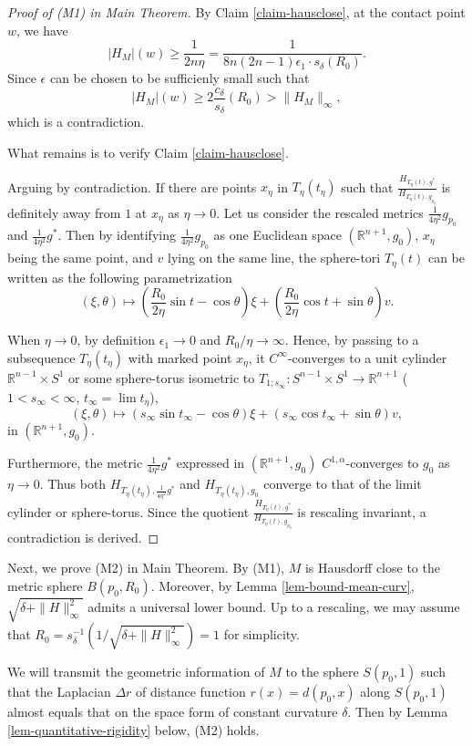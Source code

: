 \documentclass{amsart}
\numberwithin{equation}{section}
\theoremstyle{remark}
\renewcommand{\(}{\left(}
\renewcommand{\)}{\right)}
\renewcommand{\~}{\tilde}
\renewcommand{\-}{\overline}
\renewcommand{\d}{\delta}
\begin{document}
\begin{proof}[Proof of (M1) in Main Theorem]
	By Claim \ref{claim-hausclose}, at the contact point $w$, we have
	$$
	|H_M|(w)\ge \frac{1}{2n\eta}=\frac{1}{8n(2n-1)\epsilon_1\cdot s_\d(R_0)}.
	$$
	Since $\epsilon$ can be chosen to be sufficienly small such that 
	$$
	|H_M|(w)\ge 2\frac{c_\d}{s_\d}(R_0)>\|H_M\|_\infty,
	$$ 
	which is a contradiction.
	
	What remains is to verify Claim \ref{claim-hausclose}.
	
	Arguing by contradiction. If there are points $x_\eta$ in $T_\eta(t_\eta)$ such that  $\frac{H_{T_\eta(t),g^*}}{H_{T_\eta(t),g_{p_0}}}$ is definitely away from $1$ at $x_\eta$ as $\eta\to 0$. Let us consider the rescaled metrics $\frac{1}{4\eta^2}g_{p_0}$ and $\frac{1}{4\eta^2}g^*$. Then by identifying $\frac{1}{4\eta^2}g_{p_0}$ as one Euclidean space $(\mathbb R^{n+1},g_0)$, $x_\eta$ being the same point, and $v$ lying on the same line, the sphere-tori $T_\eta(t)$ can be written as the following parametrization
	$$ (\xi,\theta)\mapsto (\frac{R_0}{2\eta} \sin t-\cos \theta) \xi + (\frac{R_0}{2\eta}\cos t+\sin \theta)v.$$
	
	When $\eta\to 0$, by definition $\epsilon_1\to 0$ and $R_0/\eta\to \infty$. Hence, by passing to a subsequence $T_\eta(t_\eta)$ with marked point $x_\eta$, it $C^\infty$-converges to a unit cylinder $\mathbb R^{n-1}\times S^1$ or some sphere-torus isometric to
	$T_{1;s_\infty}: S^{n-1}\times S^1\to \mathbb R^{n+1}$ ($1<s_\infty<\infty$, $t_\infty=\lim t_\eta$),
	$$(\xi,\theta)\mapsto (s_\infty \sin t_\infty-\cos \theta) \xi + (s_\infty\cos t_\infty+\sin \theta)v,$$
	 in $(\mathbb R^{n+1},g_0)$.
	
	Furthermore, the metric $\frac{1}{4\eta^2}g^*$ expressed in $(\mathbb R^{n+1},g_0)$ $C^{1,\alpha}$-converges to $g_0$ as $\eta \to 0$.
	Thus both $H_{T_\eta(t_\eta),\frac{1}{4\eta^2}g^*}$ and
	$H_{T_\eta(t_\eta),g_{0}}$ converge to that of the limit cylinder or sphere-torus.
	Since the quotient $\frac{H_{T_\eta(t),g^*}}{H_{T_\eta(t),g_{p_0}}}$ is rescaling invariant, a contradiction is derived.
	
\end{proof}




Next, we prove (M2) in Main Theorem.
By (M1), $M$ is Hausdorff close to the metric sphere $B(p_0,R_0)$. Moreover, by Lemma \ref{lem-bound-mean-curv}, $\sqrt{\d+\|H\|_\infty^2}$ admits a universal lower bound. Up to a rescaling, we may assume that $R_0=s_\d^{-1}(1/\sqrt{\d+\|H\|_\infty^2})=1$ for simplicity.

We will transmit the geometric information of $M$ to the sphere $S(p_0,1)$ such that the Laplacian $\Delta r$ of distance function $r(x)=d(p_0,x)$ along $S(p_0,1)$ almost equals that on the space form of constant curvature $\d$. Then by Lemma \ref{lem-quantitative-rigidity} below, (M2) holds.
\end{document}
